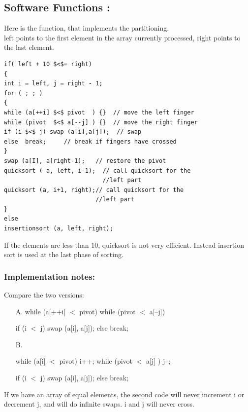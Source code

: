 \documentclass[a4paper,12pt]{article}
\begin{document}
{{	
	\subsection{Software Functions : }
		Here is the function, that implements the partitioning.\\
		left points to the first element in the array currently processed, right points to the last element. \\
		\lstset{language=C}          
		\begin{lstlisting}[frame=single] 
if( left + 10 $<$= right)
{
int i = left, j = right - 1;
for ( ; ; )
{
while (a[++i] $<$ pivot  ) {}  // move the left finger
while (pivot  $<$ a[--j] ) {}  // move the right finger
if (i $<$ j) swap (a[i],a[j]);  // swap       
else  break;     // break if fingers have crossed
}
swap (a[I], a[right-1);   // restore the pivot
quicksort ( a, left, i-1);  // call quicksort for the 
                            //left part
quicksort (a, i+1, right);// call quicksort for the 
                          //left part
}
else 
insertionsort (a, left, right);
		\end{lstlisting}
		If the elements are less than 10, quicksort is not very efficient. 
		Instead insertion sort is used at the last phase of sorting.
		
		\subsubsection{Implementation notes:}
		Compare the two versions:
		\begin{enumerate}
			
			\item[A.] 
			while (a[++i] $<$ pivot) {}
			while (pivot $<$ a[--j]) {}
			
			if (i $<$ j) swap (a[i], a[j]);
			else break;
			\item[B.] 
			
			while (a[i] $<$ pivot) {i++;}
			while (pivot $<$ a[j] ) {j--;}
			
			if (i $<$ j) swap (a[i], a[j]);
			else break;
		\end{enumerate}
		If we have an array of equal elements, the second code will never increment i or decrement j, 
		and will do infinite swaps. i and j will never cross.

		
}}
\end{document}

